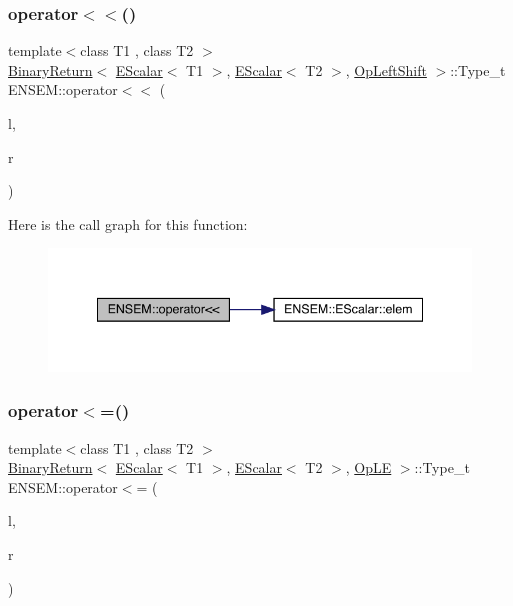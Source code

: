 \subsubsection{\texorpdfstring{operator$<$$<$()}{operator<<()}\hspace{0.1cm}{\footnotesize\ttfamily [4/4]}}
{\footnotesize\ttfamily template$<$class T1 , class T2 $>$ \\
\mbox{\hyperlink{structENSEM_1_1BinaryReturn}{Binary\+Return}}$<$ \mbox{\hyperlink{classENSEM_1_1EScalar}{E\+Scalar}}$<$ T1 $>$, \mbox{\hyperlink{classENSEM_1_1EScalar}{E\+Scalar}}$<$ T2 $>$, \mbox{\hyperlink{structENSEM_1_1OpLeftShift}{Op\+Left\+Shift}} $>$\+::Type\+\_\+t E\+N\+S\+E\+M\+::operator$<$$<$ (\begin{DoxyParamCaption}\item[{const \mbox{\hyperlink{classENSEM_1_1EScalar}{E\+Scalar}}$<$ T1 $>$ \&}]{l,  }\item[{const \mbox{\hyperlink{classENSEM_1_1EScalar}{E\+Scalar}}$<$ T2 $>$ \&}]{r }\end{DoxyParamCaption})\hspace{0.3cm}{\ttfamily [inline]}}

Here is the call graph for this function\+:
\nopagebreak
\begin{figure}[H]
\begin{center}
\leavevmode
\includegraphics[width=341pt]{d4/dca/group__escalar_ga70b4aa1415cb636de9b4b0d56d26486b_cgraph}
\end{center}
\end{figure}
\mbox{\label{group__escalar_gaf6abf7f5f838e38b67549d4af6f8683a}} 
\subsubsection{\texorpdfstring{operator$<$=()}{operator<=()}}
{\footnotesize\ttfamily template$<$class T1 , class T2 $>$ \\
\mbox{\hyperlink{structENSEM_1_1BinaryReturn}{Binary\+Return}}$<$ \mbox{\hyperlink{classENSEM_1_1EScalar}{E\+Scalar}}$<$ T1 $>$, \mbox{\hyperlink{classENSEM_1_1EScalar}{E\+Scalar}}$<$ T2 $>$, \mbox{\hyperlink{structENSEM_1_1OpLE}{Op\+LE}} $>$\+::Type\+\_\+t E\+N\+S\+E\+M\+::operator$<$= (\begin{DoxyParamCaption}\item[{const \mbox{\hyperlink{classENSEM_1_1EScalar}{E\+Scalar}}$<$ T1 $>$ \&}]{l,  }\item[{const \mbox{\hyperlink{classENSEM_1_1EScalar}{E\+Scalar}}$<$ T2 $>$ \&}]{r }\end{DoxyParamCaption})\hspace{0.3cm}{\ttfamily [inline]}}

